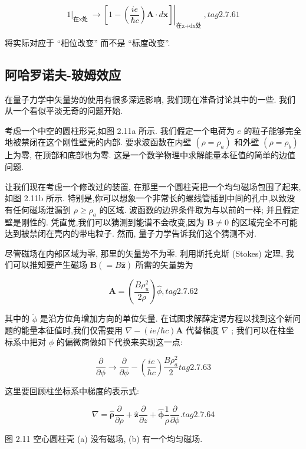 \documentclass[lang=cn,newtx,10pt,scheme=chinese,thmcnt=section]{elegantbook}
\begin{document}
$$
{\left. 1\right| }_{\text{在x处 }} \rightarrow {\left. \left\lbrack 1 - \left( \frac{ie}{\hbar c}\right) \mathbf{A} \cdot d\mathbf{x}\right\rbrack \right| }_{\text{在x+dx处 }}, tag{2.7.61}
$$

将实际对应于 “相位改变” 而不是 “标度改变”.
\subsection*{阿哈罗诺夫-玻姆效应}
在量子力学中矢量势的使用有很多深远影响, 我们现在准备讨论其中的一些. 我们从一个看似平淡无奇的问题开始.

考虑一个中空的圆柱形壳,如图 2.11a 所示. 我们假定一个电荷为 $e$ 的粒子能够完全地被禁闭在这个刚性壁壳的内部. 要求波函数在内壁 $\left( {\rho = {\rho }_{a}}\right)$ 和外壁 $\left( {\rho = {\rho }_{b}}\right)$ 上为零, 在顶部和底部也为零. 这是一个数学物理中求解能量本征值的简单的边值问题.

让我们现在考虑一个修改过的装置, 在那里一个圆柱壳把一个均匀磁场包围了起来, 如图 2.11b 所示. 特别是,你可以想象一个非常长的螺线管插到中间的孔中,以致没有任何磁场泄漏到 $\rho \geq {\rho }_{a}$ 的区域. 波函数的边界条件取为与以前的一样; 并且假定壁是刚性的. 凭直觉,我们可以猜测到能谱不会改变,因为 $\mathbf{B} \neq 0$ 的区域完全不可能达到被禁闭在壳内的带电粒子. 然而, 量子力学告诉我们这个猜测不对.

尽管磁场在内部区域为零, 那里的矢量势不为零. 利用斯托克斯 (Stokes) 定理, 我们可以推知要产生磁场 $\mathbf{B}\left( { = B\widehat{\mathbf{z}}}\right)$ 所需的矢量势为

$$
\mathbf{A} = \left( \frac{B{\rho }_{u}^{2}}{2\rho }\right) \widehat{\phi }, tag{2.7.62}
$$

其中的 $\widetilde{\phi }$ 是沿方位角增加方向的单位矢量. 在试图求解薛定谔方程以找到这个新问题的能量本征值时,我们仅需要用 $\nabla - \left( {{ie}/\hbar c}\right) \mathbf{A}$ 代替梯度 $\nabla$ ; 我们可以在柱坐标系中把对 $\phi$ 的偏微商做如下代换来实现这一点:

$$
\frac{\partial }{\partial \phi } \rightarrow \frac{\partial }{\partial \phi } - \left( \frac{ie}{\hbar c}\right) \frac{B{\rho }_{a}^{2}}{2} tag{2. 7.63}
$$

这里要回顾柱坐标系中梯度的表示式:

$$
\nabla = \widehat{\mathbf{\rho }}\frac{\partial }{\partial \rho } + \widehat{\mathbf{z}}\frac{\partial }{\partial z} + \widehat{\mathbf{\phi }}\frac{1}{\rho }\frac{\partial }{\partial \phi }. tag{2. 7.64}
$$


图 2.11 空心圆柱壳 (a) 没有磁场, (b) 有一个均匀磁场.
\end{document}
